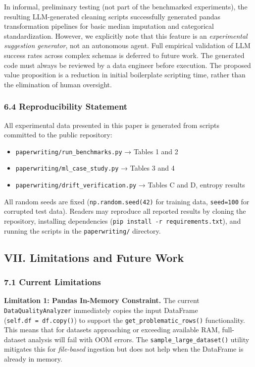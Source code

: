 \documentclass{article}
\begin{document}
In informal, preliminary testing (not part of the benchmarked
experiments), the resulting LLM-generated cleaning scripts successfully
generated pandas transformation pipelines for basic median imputation
and categorical standardization. However, we explicitly note that this
feature is an \emph{experimental suggestion generator}, not an
autonomous agent. Full empirical validation of LLM success rates across
complex schemas is deferred to future work. The generated code must
always be reviewed by a data engineer before execution. The proposed
value proposition is a reduction in initial boilerplate scripting time,
rather than the elimination of human oversight.

\subsubsection{6.4 Reproducibility
Statement}\label{reproducibility-statement}

All experimental data presented in this paper is generated from scripts
committed to the public repository:

\begin{itemize}
\item
  \texttt{paperwriting/run\_benchmarks.py} → Tables 1 and 2
\item
  \texttt{paperwriting/ml\_case\_study.py} → Tables 3 and 4
\item
  \texttt{paperwriting/drift\_verification.py} → Tables C and D, entropy
  results
\end{itemize}

All random seeds are fixed (\texttt{np.random.seed(42)} for training
data, \texttt{seed=100} for corrupted test data). Readers may reproduce
all reported results by cloning the repository, installing dependencies
(\texttt{pip~install~-r~requirements.txt}), and running the scripts in
the \texttt{paperwriting/} directory.

\subsection{VII. Limitations and Future
Work}\label{vii.-limitations-and-future-work}

\subsubsection{7.1 Current Limitations}\label{current-limitations}

\textbf{Limitation 1: Pandas In-Memory Constraint.} The current
\texttt{DataQualityAnalyzer} immediately copies the input DataFrame
(\texttt{self.df~=~df.copy()}) to support the
\texttt{get\_problematic\_rows()} functionality. This means that for
datasets approaching or exceeding available RAM, full-dataset analysis
will fail with OOM errors. The \texttt{sample\_large\_dataset()} utility
mitigates this for \emph{file-based} ingestion but does not help when
the DataFrame is already in memory.
\end{document}
